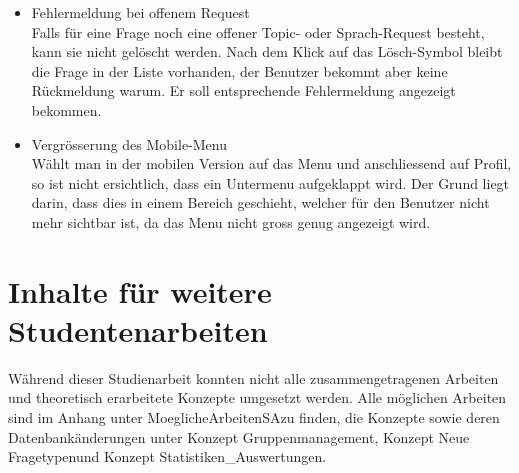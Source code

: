 \begin{itemize}
	\item Fehlermeldung bei offenem Request\\
	Falls für eine Frage noch eine offener Topic- oder Sprach-Request besteht, kann sie nicht gelöscht werden. Nach dem Klick auf das Lösch-Symbol bleibt die Frage in der Liste vorhanden, der Benutzer bekommt aber keine Rückmeldung warum. Er soll entsprechende Fehlermeldung angezeigt bekommen.
	
	\item Vergrösserung des Mobile-Menu\\
	Wählt man in der mobilen Version auf das Menu und anschliessend auf Profil, so ist nicht ersichtlich, dass ein Untermenu aufgeklappt wird. Der Grund liegt darin, dass dies in einem Bereich geschieht, welcher für den Benutzer nicht mehr sichtbar ist, da das Menu nicht gross genug angezeigt wird.
\end{itemize}





\section{Inhalte für weitere Studentenarbeiten}
\label{sec:InhalteFuerStudentenarbeiten}

Während dieser Studienarbeit konnten nicht alle zusammengetragenen Arbeiten und theoretisch erarbeitete Konzepte umgesetzt werden. Alle möglichen Arbeiten sind im Anhang unter \glqq MoeglicheArbeitenSA\grqq zu finden, die Konzepte sowie deren Datenbankänderungen unter \glqq Konzept Gruppenmanagement\grqq, \glqq Konzept Neue Fragetypen\grqq und \glqq Konzept Statistiken\_Auswertungen\grqq.
		


